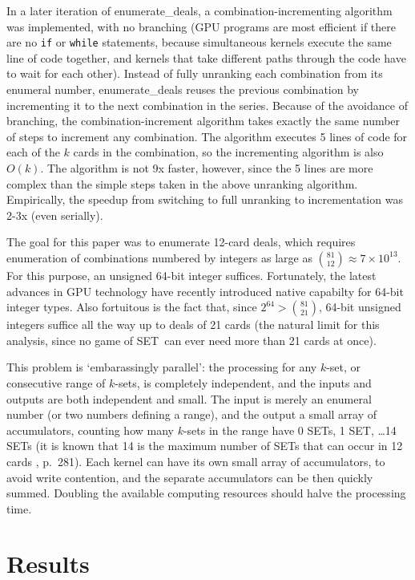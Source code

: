 \documentclass[10pt]{amsart}
\newcommand{\SETb}{SET\texttrademark\ } %
\newcommand{\ED}{{\sc enumerate\_deals}}
\newcommand{\EDb}{{\sc enumerate\_deals }}
\begin{document}
In a later iteration of \ED, a combination-incrementing algorithm was
implemented, with no branching (GPU programs are most efficient if there are no
{\tt if} or {\tt while} statements, because simultaneous kernels execute the
same line of code together, and kernels that take different paths through the
code have to wait for each other). Instead of fully unranking each combination
from its enumeral number, \EDb reuses the previous combination by incrementing
it to the next combination in the series. Because of the avoidance of branching,
the combination-increment algorithm takes exactly the same number of steps to
increment any combination. The algorithm executes 5 lines of code for each of
the $k$ cards in the combination, so the incrementing algorithm is also
$O(k)$. The algorithm is not 9x faster, however, since the 5 lines are more
complex than the simple steps taken in the above unranking
algorithm. Empirically, the speedup from switching to full unranking to
incrementation was 2-3x (even serially).

The goal for this paper was to enumerate 12-card deals, which requires
enumeration of combinations numbered by integers as large as $\binom{81}{12}
\approx 7\times 10^{13}$. For this purpose, an unsigned 64-bit integer
suffices. Fortunately, the latest advances in GPU technology have recently
introduced native capabilty for 64-bit integer types. Also fortuitous is the
fact that, since $2^{64} > \binom{81}{21}$, 64-bit unsigned integers suffice all
the way up to deals of 21 cards (the natural limit for this analysis, since no
game of \SETb can ever need more than 21 cards at once).

This problem is `embarassingly parallel': the processing for any $k$-set, or
consecutive range of $k$-sets, is completely independent, and the inputs and
outputs are both independent and small. The input is merely an enumeral number
(or two numbers defining a range), and the output a small array of accumulators,
counting how many $k$-sets in the range have 0 SETs, 1 SET, \ldots 14 SETs (it
is known that 14 is the maximum number of SETs that can occur in 12 cards
\cite{VINCI}, \cite{JOS} p.~281). Each kernel can have its own small array of
accumulators, to avoid write contention, and the separate accumulators can be
then quickly summed. Doubling the available computing resources should halve the
processing time.

\section{Results}
\end{document}
